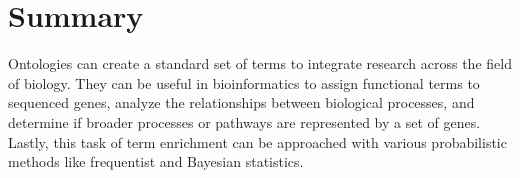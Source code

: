 \documentclass[12pt]{article}
\begin{document}
\section{Summary}
Ontologies can create a standard set of terms to integrate research across the field of biology. They can be useful in bioinformatics to assign functional terms to sequenced genes, analyze the relationships between biological processes, and determine if broader processes or pathways are represented by a set of genes. Lastly, this task of term enrichment can be approached with various probabilistic methods like frequentist and Bayesian statistics.
\end{document}

